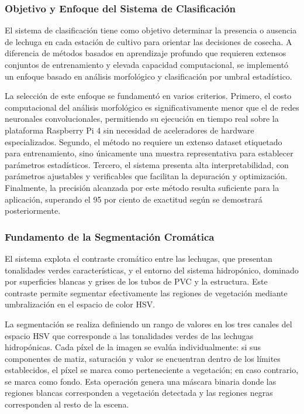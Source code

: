 \subsubsection{Objetivo y Enfoque del Sistema de Clasificación}

El sistema de clasificación tiene como objetivo determinar la presencia o ausencia de lechuga en cada estación de cultivo para orientar las decisiones de cosecha. A diferencia de métodos basados en aprendizaje profundo que requieren extensos conjuntos de entrenamiento y elevada capacidad computacional, se implementó un enfoque basado en análisis morfológico y clasificación por umbral estadístico.

La selección de este enfoque se fundamentó en varios criterios. Primero, el costo computacional del análisis morfológico es significativamente menor que el de redes neuronales convolucionales, permitiendo su ejecución en tiempo real sobre la plataforma Raspberry Pi 4 sin necesidad de aceleradores de hardware especializados. Segundo, el método no requiere un extenso dataset etiquetado para entrenamiento, sino únicamente una muestra representativa para establecer parámetros estadísticos. Tercero, el sistema presenta alta interpretabilidad, con parámetros ajustables y verificables que facilitan la depuración y optimización. Finalmente, la precisión alcanzada por este método resulta suficiente para la aplicación, superando el 95 por ciento de exactitud según se demostrará posteriormente.

\subsubsection{Fundamento de la Segmentación Cromática}

El sistema explota el contraste cromático entre las lechugas, que presentan tonalidades verdes características, y el entorno del sistema hidropónico, dominado por superficies blancas y grises de los tubos de PVC y la estructura. Este contraste permite segmentar efectivamente las regiones de vegetación mediante umbralización en el espacio de color HSV.

La segmentación se realiza definiendo un rango de valores en los tres canales del espacio HSV que corresponde a las tonalidades verdes de las lechugas hidropónicas. Cada píxel de la imagen se evalúa individualmente: si sus componentes de matiz, saturación y valor se encuentran dentro de los límites establecidos, el píxel se marca como perteneciente a vegetación; en caso contrario, se marca como fondo. Esta operación genera una máscara binaria donde las regiones blancas corresponden a vegetación detectada y las regiones negras corresponden al resto de la escena.

